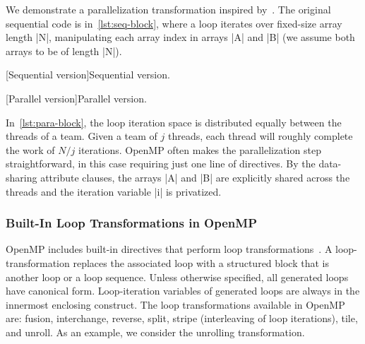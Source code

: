 \begin{example}\label{ex:seq-transformation}

We demonstrate a parallelization transformation inspired by~\textcite{singal2019}.
The original sequential code is in~\autoref{lst:seq-block}, where a loop iterates over
fixed-size array length \pr|N|, manipulating each array index in arrays \pr|A| and \pr|B|
(we assume both arrays to be of length \pr|N|).

\begin{center}
\begin{minipage}{\textwidth}
\begin{minipage}{.45\textwidth}
\captionsetup{type=lstlisting}
[Sequential version]{Sequential version.}
\label{lst:seq-block}
\end{minipage}\hfill%
\begin{minipage}{.45\textwidth}
[Parallel version]{Parallel version.}
\label{lst:para-block}
\end{minipage}
\end{minipage}
\end{center}

In~\autoref{lst:para-block}, the loop iteration space is distributed equally between the threads of a team.
Given a team of \(j\) threads, each thread will roughly complete the work of \(N/j\) iterations.
OpenMP often makes the parallelization step straightforward, in this case requiring just one line of directives.
By the data-sharing attribute clauses, the arrays \pr|A| and \pr|B| are explicitly shared across
the threads and the iteration variable \pr|i| is privatized.
\end{example}

\subsubsection{Built-In Loop Transformations in OpenMP}
\label{openmp-transforms}

OpenMP includes built-in directives that perform loop transformations~\cite{openmp_api}.
A loop-transformation replaces the associated loop with a structured block
that is another loop or a loop sequence.
Unless otherwise specified, all generated loops have canonical form.
Loop-iteration variables of generated loops are always  in the innermost enclosing construct.
The loop transformations available in OpenMP are:
fusion,
interchange,
reverse,
split,
stripe (interleaving of loop iterations),
tile, and
unroll.
As an example, we consider the unrolling transformation.

